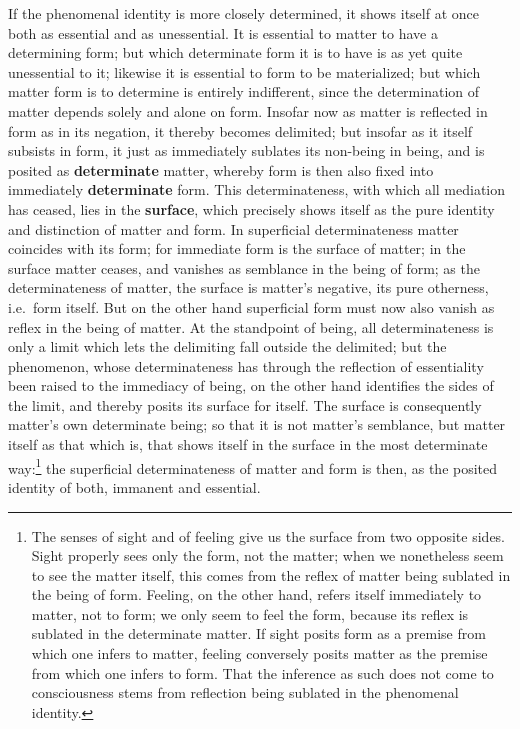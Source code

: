 \documentclass[12pt,a4paper,openany]{book}
\newcommand{\opage}[1]{\marginnote{\footnotesize\textit{[#1]}}}
\begin{document}
If the phenomenal identity is more closely determined, it
shows itself at once both as essential and
as unessential. It is essential to matter to have
a determining form; but which determinate form it
is to have is as yet quite unessential to it; likewise
it is essential to form to be materialized; but which
matter form is to determine is entirely indifferent,
since the determination of matter depends solely and alone
on form. Insofar now as matter is reflected in
form as in its negation, it thereby becomes delimited;
but insofar as it itself subsists in form, it
just as immediately sublates its non-being in being,
and is posited as \textbf{determinate} matter, whereby form
is then also fixed into immediately \textbf{determinate} form. This
determinateness, with which all mediation has ceased, lies in
the \textbf{surface}, which precisely shows itself as the pure identity
and distinction of matter and form. In superficial
determinateness matter coincides with its form; for
immediate form is the surface of matter; in the surface
matter ceases, and vanishes as semblance in the being
of form; as the determinateness of matter, the surface is
matter's negative, its pure otherness, i.e.\ form itself. But on the other hand superficial
form must now also vanish as reflex in the being of
matter. At the standpoint of being, all determinateness is
only a limit which lets the delimiting fall
outside the delimited; but the phenomenon, whose determinateness
has through the reflection of essentiality been raised to
\setcounter{footnote}{0}%
\opage{148}the immediacy of being, on the other hand identifies the sides of the
limit, and thereby posits its surface for itself. The surface
is consequently matter's own determinate being; so that it
is not matter's semblance, but matter itself as that which is,
that shows itself in the surface in the most determinate way:\footnote{The senses of sight and of feeling give us the surface from two opposite sides. Sight properly sees only the form, not the matter; when we nonetheless seem to see the matter itself, this comes from the reflex of matter being sublated in the being of form. Feeling, on the other hand, refers itself immediately to matter, not to form; we only seem to feel the form, because its reflex is sublated in the determinate matter. If sight posits form as a premise from which one infers to matter, feeling conversely posits matter as the premise from which one infers to form. That the inference as such does not come to consciousness stems from reflection being sublated in the phenomenal identity.}
the superficial determinateness of matter and form is
then, as the posited identity of both, immanent and essential.
\end{document}
